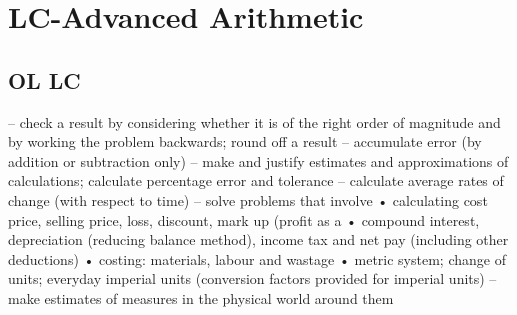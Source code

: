 \chapter{LC-Advanced Arithmetic}

\section{OL LC}

– check a result by considering whether
it is of the right order of magnitude
and by working the problem
backwards; round off a result
– accumulate error (by addition or
subtraction only)
– make and justify estimates and
approximations of calculations;
calculate percentage error and
tolerance
– calculate average rates of change (with
respect to time)
– solve problems that involve
• calculating cost price, selling price,
loss, discount, mark up (profit as a
• compound interest, depreciation
(reducing balance method), income
tax and net pay (including other
deductions)
• costing: materials, labour and
wastage
• metric system; change of units;
everyday imperial units (conversion
factors provided for imperial units)
– make estimates of measures in the
physical world around them